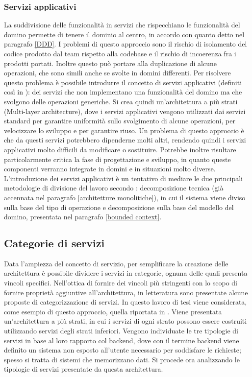 \documentclass[12pt]{report}
\begin{document}
\subsubsection{Servizi applicativi}\label{servizi applicativi}
La suddivisione delle funzionalità in servizi che rispecchiano le funzionalità del domino permette di tenere il dominio al centro, in accordo con quanto detto nel paragrafo \ref{DDD}. 
I problemi di questo approccio sono il rischio di isolamento del codice prodotto dal team rispetto alla codebase e il rischio di incoerenza fra i prodotti portati.
Inoltre questo può portare alla duplicazione di alcune operazioni, che sono simili anche se svolte in domini differenti.
Per risolvere questo problema è possibile introdurre il concetto di servizi applicativi (definiti così in \cite{erl_service-oriented}): dei servizi che non implementano una funzionalità del domino ma che svolgono delle operazioni generiche.
Si crea quindi un'architettura a più strati (Multi-layer architecture), dove i servizi applicativi vengono utilizzati dai servizi standard per garantire uniformità sullo svolgimento di alcune operazioni, per velocizzare lo sviluppo e per garantire riuso.
Un problema di questo approccio è che da questi servizi potrebbero dipenderne molti altri, rendendo quindi i servizi applicativi molto difficili da modificare o sostituire.
Potrebbe inoltre risultare particolarmente critica la fase di progettazione e sviluppo, in quanto queste componenti verranno integrate in domini e in situazioni molto diverse.
L'introduzione dei servizi applicativi è un tentativo di mediare le due principali metodologie di divisione del lavoro secondo \cite{richards_fundamentals_2020}: decomposizione tecnica (già accennata nel paragrafo \ref{architetture monolitiche}), in cui il sistema viene diviso sulla base del tipo di operazione e decomposizione sulla base del modello del domino, presentata nel paragrafo \ref{bounded context}.

\subsection{Categorie di servizi}
Data l'ampiezza del concetto di servizio, per semplificare la creazione delle architettura è possibile dividere i servizi in categorie, ognuna delle quali presenta vincoli specifici.
Nell'ottica di fornire dei vincoli più stringenti con lo scopo di fornire proprietà aggiuntive all'architettura, in letteratura sono presentate alcune proposte di categorizzazione di servizi. 
In questo lavoro di tesi viene considerata, come esempio di questo approccio, quella riportata in \cite {erl_service-oriented}.
Viene presentata un'architettura a più strati, in cui i servizi di ogni strato possono essere costruiti utilizzando servizi degli strati inferiori.
Vengono individuate le tre tipologie di servizi in base al loro rapporto col backend, dove con il termine backend viene definito un sistema non esposto all'utente necessario per soddisfare le richieste; spesso si tratta di sistemi che memorizzano dati.
Si procede ora analizzando le tipologie di servizi presentate da questa architettura.
\end{document}
